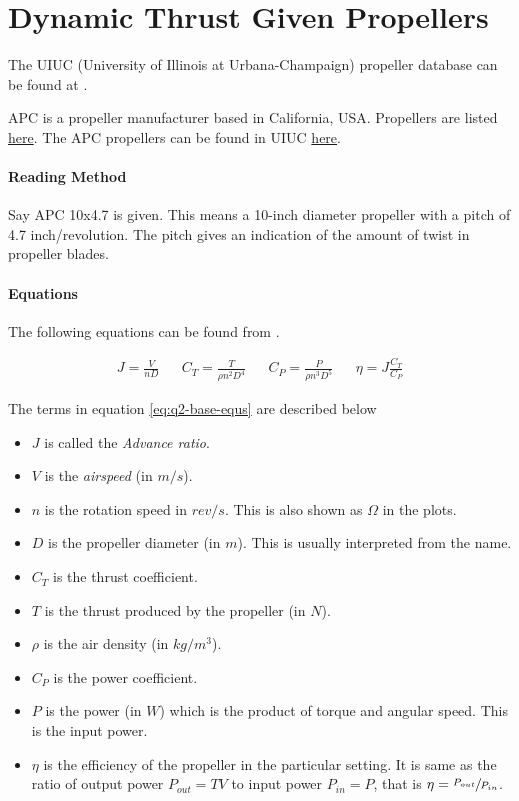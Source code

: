 \section{Dynamic Thrust Given Propellers}

The UIUC (University of Illinois at Urbana-Champaign) propeller database can be found at \cite{uiuc-database}.

\noindent
APC is a propeller manufacturer based in California, USA. Propellers are listed \href{https://www.apcprop.com/product-category/multi-copters-drones/}{here}. The APC propellers can be found in UIUC \href{https://m-selig.ae.illinois.edu/props/volume-1/propDB-volume-1.html#APC}{here}.

\paragraph*{Reading Method}
Say APC 10x4.7 is given. This means a 10-inch diameter propeller with a pitch of 4.7 inch/revolution. The pitch gives an indication of the amount of twist in propeller blades.

\paragraph*{Equations}
The following equations can be found from \cite{brandt2011propeller,aerotrash-uiuc-article,uiuc-data-equs}.

\begin{align}
    J = \frac{V}{nD} &&
    C_{T} = \frac{T}{\rho n^2 D^4} &&
    C_{P} = \frac{P}{\rho n^3 D^5} &&
    \eta = J \frac{C_T}{C_P}
    \label{eq:q2-base-equs}
\end{align}

The terms in equation \ref{eq:q2-base-equs} are described below

\begin{itemize}
    \item $J$ is called the \emph{Advance ratio}.
    \item $V$ is the \emph{airspeed} (in $m/s$).
    \item $n$ is the rotation speed in $rev/s$. This is also shown as $\Omega$ in the plots.
    \item $D$ is the propeller diameter (in $m$). This is usually interpreted from the name.
    \item $C_T$ is the thrust coefficient.
    \item $T$ is the thrust produced by the propeller (in $N$).
    \item $\rho$ is the air density (in $kg/m^3$).
    \item $C_P$ is the power coefficient.
    \item $P$ is the power (in $W$) which is the product of torque and angular speed. This is the input power.
    \item $\eta$ is the efficiency of the propeller in the particular setting. It is same as the ratio of output power $P_{out} = TV$ to input power $P_{in} = P$, that is $\eta = \sfrac{P_{out}}{P_{in}}$.
\end{itemize}


